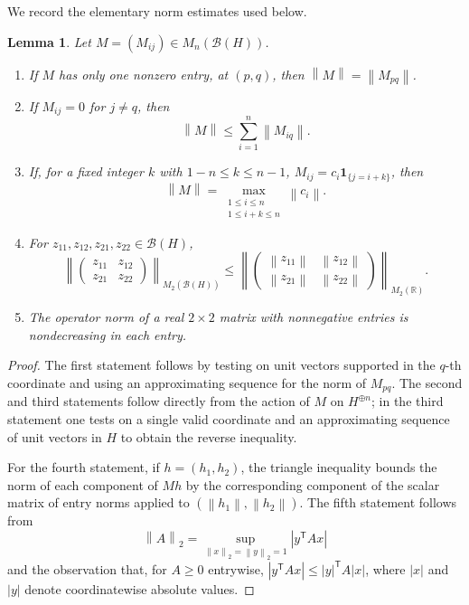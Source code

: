 \documentclass[11pt]{amsart}
\numberwithin{equation}{section}
\newtheorem{lemma}[lemma]{Lemma}
\theoremstyle{remark}
\newcommand{\norm}[1]{\left\lVert #1\right\rVert}
\newcommand{\abs}[1]{\left\lvert #1\right\rvert}
\newcommand{\ind}[1]{\mathbf 1_{\{#1\}}}
\begin{document}
We record the elementary norm estimates used below.

\begin{lemma}\label{lem:matrix-norms}
Let $M=(M_{ij})\in M_n(\mathcal B(H))$.
\begin{enumerate}
\item If $M$ has only one nonzero entry, at $(p,q)$, then
$\norm M=\norm{M_{pq}}$.
\item If $M_{ij}=0$ for $j\neq q$, then
\[
 \norm M\leq\sum_{i=1}^n\norm{M_{iq}}.
\]
\item If, for a fixed integer $k$ with $1-n\leq k\leq n-1$,
$M_{ij}=c_i\ind{j=i+k}$, then
\[
 \norm M
 =\max_{\substack{1\leq i\leq n\\1\leq i+k\leq n}}
 \norm{c_i}.
\]
\item For $z_{11},z_{12},z_{21},z_{22}\in\mathcal B(H)$,
\[
 \norm{
 \begin{pmatrix}
 z_{11}&z_{12}\\z_{21}&z_{22}
 \end{pmatrix}}_{M_2(\mathcal B(H))}
 \leq
 \norm{
 \begin{pmatrix}
 \norm{z_{11}}&\norm{z_{12}}\\
 \norm{z_{21}}&\norm{z_{22}}
 \end{pmatrix}}_{M_2(\mathbb R)}.
\]
\item The operator norm of a real $2\times2$ matrix with nonnegative entries
is nondecreasing in each entry.
\end{enumerate}
\end{lemma}

\begin{proof}
The first statement follows by testing on unit vectors supported in the
$q$-th coordinate and using an approximating sequence for the norm of
$M_{pq}$.  The second and third statements follow directly from the action of
$M$ on $H^{\oplus n}$; in the third statement one tests on a single valid
coordinate and an approximating sequence of unit vectors in $H$ to obtain the
reverse inequality.

For the fourth statement, if $h=(h_1,h_2)$, the triangle inequality bounds the
norm of each component of $Mh$ by the corresponding component of the scalar
matrix of entry norms applied to $(\norm{h_1},\norm{h_2})$.  The fifth statement follows from
\[
 \norm A_2=\sup_{\norm{x}_2=\norm{y}_2=1}\abs{y^{\mathsf T}Ax}
\]
and the observation that, for $A\geq0$ entrywise,
\(
 \abs{y^{\mathsf T}Ax}\leq |y|^{\mathsf T}A|x|
\), where $|x|$ and $|y|$ denote coordinatewise absolute values.
\end{proof}
\end{document}
